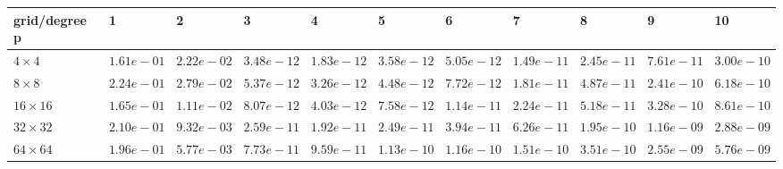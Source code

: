 \begin{tabular}{lllllllllll}
\hline
 grid/degree p   & 1          & 2          & 3          & 4          & 5          & 6          & 7          & 8          & 9          & 10         \\
\hline
 $4 \times 4$    & $1.61e-01$ & $2.22e-02$ & $3.48e-12$ & $1.83e-12$ & $3.58e-12$ & $5.05e-12$ & $1.49e-11$ & $2.45e-11$ & $7.61e-11$ & $3.00e-10$ \\
 $8 \times 8$    & $2.24e-01$ & $2.79e-02$ & $5.37e-12$ & $3.26e-12$ & $4.48e-12$ & $7.72e-12$ & $1.81e-11$ & $4.87e-11$ & $2.41e-10$ & $6.18e-10$ \\
 $16 \times 16$  & $1.65e-01$ & $1.11e-02$ & $8.07e-12$ & $4.03e-12$ & $7.58e-12$ & $1.14e-11$ & $2.24e-11$ & $5.18e-11$ & $3.28e-10$ & $8.61e-10$ \\
 $32 \times 32$  & $2.10e-01$ & $9.32e-03$ & $2.59e-11$ & $1.92e-11$ & $2.49e-11$ & $3.94e-11$ & $6.26e-11$ & $1.95e-10$ & $1.16e-09$ & $2.88e-09$ \\
 $64 \times 64$  & $1.96e-01$ & $5.77e-03$ & $7.73e-11$ & $9.59e-11$ & $1.13e-10$ & $1.16e-10$ & $1.51e-10$ & $3.51e-10$ & $2.55e-09$ & $5.76e-09$ \\
\hline
\end{tabular}